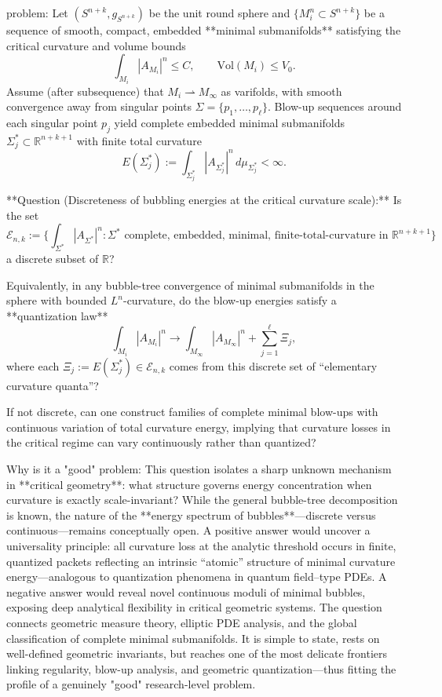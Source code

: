 problem:  
Let \( (S^{n+k}, g_{S^{n+k}}) \) be the unit round sphere and  
\(\{M_i^n\subset S^{n+k}\}\) be a sequence of smooth, compact, embedded **minimal submanifolds** satisfying the critical curvature and volume bounds  
\[
\int_{M_i} |A_{M_i}|^n \le C, \qquad \mathrm{Vol}(M_i)\le V_0.
\]  
Assume (after subsequence) that \(M_i\rightharpoonup M_\infty\) as varifolds, with smooth convergence away from singular points \(\Sigma=\{p_1,\dots,p_\ell\}\).  
Blow-up sequences around each singular point \(p_j\) yield complete embedded minimal submanifolds  
\(\Sigma_j^\ast\subset \mathbb{R}^{n+k+1}\) with finite total curvature  
\[
E(\Sigma_j^\ast):=\int_{\Sigma_j^\ast} |A_{\Sigma_j^\ast}|^n\, d\mu_{\Sigma_j^\ast} <\infty.
\]

**Question (Discreteness of bubbling energies at the critical curvature scale):**  
Is the set  
\[
\mathcal{E}_{n,k}:=\Big\{\int_{\Sigma^\ast} |A_{\Sigma^\ast}|^n : \Sigma^\ast \text{ complete, embedded, minimal, finite-total-curvature in }\mathbb{R}^{n+k+1}\Big\}
\]  
a discrete subset of \( \mathbb{R} \)?  

Equivalently, in any bubble-tree convergence of minimal submanifolds in the sphere with bounded \(L^n\)-curvature, do the blow-up energies satisfy a **quantization law**
\[
\int_{M_i}|A_{M_i}|^n \to \int_{M_\infty}|A_{M_\infty}|^n + \sum_{j=1}^\ell \Xi_j,
\]
where each \(\Xi_j := E(\Sigma_j^\ast)\in \mathcal{E}_{n,k}\) comes from this discrete set of “elementary curvature quanta”?  

If not discrete, can one construct families of complete minimal blow-ups with continuous variation of total curvature energy, implying that curvature losses in the critical regime can vary continuously rather than quantized?

Why is it a "good" problem:  
This question isolates a sharp unknown mechanism in **critical geometry**: what structure governs energy concentration when curvature is exactly scale-invariant?  While the general bubble-tree decomposition is known, the nature of the **energy spectrum of bubbles**—discrete versus continuous—remains conceptually open.  
A positive answer would uncover a universality principle: all curvature loss at the analytic threshold occurs in finite, quantized packets reflecting an intrinsic “atomic” structure of minimal curvature energy—analogous to quantization phenomena in quantum field–type PDEs.  
A negative answer would reveal novel continuous moduli of minimal bubbles, exposing deep analytical flexibility in critical geometric systems.  
The question connects geometric measure theory, elliptic PDE analysis, and the global classification of complete minimal submanifolds. It is simple to state, rests on well-defined geometric invariants, but reaches one of the most delicate frontiers linking regularity, blow-up analysis, and geometric quantization—thus fitting the profile of a genuinely "good" research-level problem.